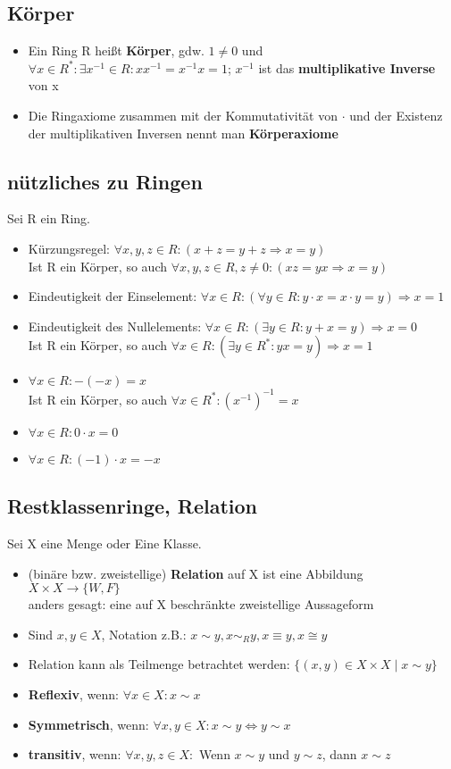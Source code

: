 \documentclass[titlepage]{article}
\newcommand{\1}{\mathbb{1}}
\newcommand{\0}{\mathbb{0}}
\begin{document}
			\subsection{Körper}
				\begin{itemize}
					\item Ein Ring R heißt \textbf{Körper}, gdw. $1\neq0$ und $\forall x\in R^*:\exists x^{-1}\in R:xx^{-1}=x^{-1}x=1$; $x^{-1}$ ist das \textbf{multiplikative Inverse} von x
					\item Die Ringaxiome zusammen mit der Kommutativität von $\cdot$ und der Existenz der multiplikativen Inversen nennt man \textbf{Körperaxiome}
				\end{itemize}
			\subsection{nützliches zu Ringen}
			Sei R ein Ring.
				\begin{itemize}
					\item Kürzungsregel: $\forall x,y,z\in R:(x+z=y+z\Rightarrow x=y)$\\
					Ist R ein Körper, so auch $\forall x,y,z\in R,z\neq0:(xz=yx\Rightarrow x=y)$
					\item Eindeutigkeit der Einselement: $\forall x\in R:(\forall y\in R:y\cdot x=x\cdot y=y)\Rightarrow x=1$
					\item Eindeutigkeit des Nullelements: $\forall x\in R:(\exists y\in R:y+x=y)\Rightarrow x=0$\\
					Ist R ein Körper, so auch $\forall x\in R:(\exists y\in R^*:yx=y)\Rightarrow x=1$
					\item $\forall x\in R:-(-x)=x$\\
					Ist R ein Körper, so auch $\forall x\in R^*:(x^{-1})^{-1}=x$
					\item $\forall x\in R:0\cdot x=0$
					\item $\forall x\in R:(-1)\cdot x=-x$
				\end{itemize}
			\subsection{Restklassenringe, Relation}
				Sei X eine Menge oder Eine Klasse.
					\begin{itemize}
						\item (binäre bzw. zweistellige) \textbf{Relation} auf X ist eine Abbildung $X\times X\rightarrow\{W,F\}$\\
						anders gesagt: eine auf X beschränkte zweistellige Aussageform
						\item Sind $x,y\in X$, Notation z.B.: $x\sim y,x\sim_Ry,x\equiv y, x\cong y$
						\item Relation kann als Teilmenge betrachtet werden: $\{(x,y)\in X\times X\mid x\sim y\}$\\
						\item \textbf{Reflexiv}, wenn: $\forall x\in X:x\sim x$
						\item \textbf{Symmetrisch}, wenn: $\forall x,y\in X:x\sim y\Longleftrightarrow y\sim x$
						\item \textbf{transitiv}, wenn: $\forall x,y,z\in X:$ Wenn $x\sim y$ und $y\sim z$, dann $x\sim z$
					\end{itemize}
\end{document}
